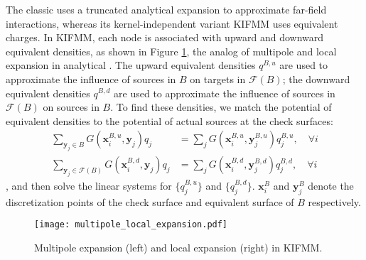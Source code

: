 The classic \fmm uses a truncated analytical expansion to approximate far-field interactions, whereas its kernel-independent variant KIFMM uses equivalent charges.
In KIFMM, each node is associated with upward and downward equivalent densities, as shown in Figure \ref{fig:multipole_local}, the analog of multipole and local expansion in analytical \fmm.
The upward equivalent densities $q^{B,u}$ are used to approximate the influence of sources in $B$ on targets in $\mathcal{F}(B)$;
the downward equivalent densities $q^{B,d}$ are used to approximate the influence of sources in $\mathcal{F}(B)$ on sources in $B$.
To find these densities, we match the potential of equivalent densities to the potential of actual sources at the check surfaces:
%
\begin{align}
    \sum_{\mathbf{y}_{j} \in B} G\left(\mathbf{x}_{i}^{B,u}, \mathbf{y}_{j}\right) q_{j} &= \sum_{j} G\left(\mathbf{x}_{i}^{B,u}, \mathbf{y}^{B,u}_{j}\right) q^{B,u}_{j}, \quad \forall i  \\
    \sum_{\mathbf{y}_{j} \in \mathcal{F}(B)} G\left(\mathbf{x}_{i}^{B,d}, \mathbf{y}_{j}\right) q_{j} &= \sum_{j} G\left(\mathbf{x}_{i}^{B,d}, \mathbf{y}^{B,d}_{j}\right) q^{B,d}_{j}, \quad \forall i
    \label{eq:multipole_local}
\end{align}
%
, and then solve the linear systems for $\{q^{B,u}_{j}\}$ and $\{q^{B,d}_{j}\}$.
$\mathbf{x}_{i}^{B}$ and $\mathbf{y}_{j}^{B}$ denote the discretization points of the check surface and equivalent surface of $B$ respectively.

\begin{figure}
    \centering
    \texttt{[image: multipole\_local\_expansion.pdf]}
    \caption{Multipole expansion (left) and local expansion (right) in KIFMM.}
    \label{fig:multipole_local}
\end{figure}

